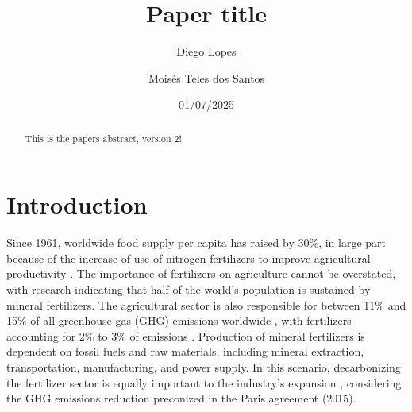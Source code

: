 \documentclass[a4paper, titlepage]{article}
\begin{document}
\title{Paper title}
\author{
	Diego Lopes\\
	\and
	Moisés Teles dos Santos}
\date{01/07/2025}
\maketitle

\begin{abstract}
	This is the papers abstract, version 2!
\end{abstract}

\section{Introduction}

Since 1961, worldwide food supply per capita has raised by 30\%, in large part because of the increase of use of
nitrogen fertilizers to improve agricultural productivity \cite{mbowIPCCSpecialReport2019}. The importance of
fertilizers on agriculture cannot be overstated, with research indicating that half of the world’s population
is sustained by mineral fertilizers. The agricultural sector is also responsible for between 11\% and 15\% of
all greenhouse gas (GHG) emissions worldwide \cite{ifaEstimatingReportingFertilizerRelated2016}, with fertilizers
accounting for 2\% to 3\% of emissions \cite{brentrupCarbonFootprintAnalysis2016}. Production of mineral fertilizers
is dependent on fossil fuels and raw materials, including mineral extraction,
transportation, manufacturing, and power supply. In this scenario, decarbonizing the fertilizer sector is equally
important to the industry’s expansion \cite{ouikhalfanNetZeroEmissionFertilizers2022}, considering the GHG emissions
reduction preconized in the Paris agreement (2015).
\end{document}
